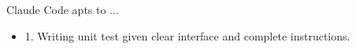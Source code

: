 \documentclass[aspectratio=169]{beamer}
\begin{document}
\begin{frame}{Claude Code apts to ...}
	\begin{itemize}
		\item 1. Writing unit test given clear interface and complete instructions.
	\end{itemize}
\end{frame}




 
 


 
        
\end{document}
